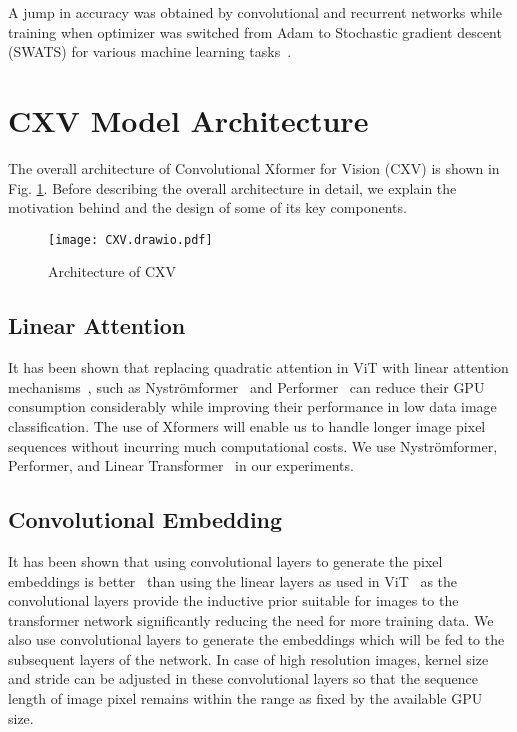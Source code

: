 \documentclass{article}
\begin{document}
A jump in accuracy was obtained by convolutional and recurrent networks while training when optimizer was switched from Adam to Stochastic gradient descent (SWATS) for various machine learning tasks~\cite{keskar2017improving}. 


\section{CXV Model Architecture}

The overall architecture of Convolutional Xformer for Vision (CXV) is shown in Fig. \ref{fig:CXV}. Before describing the overall architecture in detail, we explain the motivation behind and the design of some of its key components.
\begin{figure}[h]
\centering
\texttt{[image: CXV.drawio.pdf]}
\caption{Architecture of CXV}
\label{fig:CXV}
\end{figure}






\subsection{Linear Attention}

It has been shown that replacing quadratic attention in ViT with linear attention mechanisms~\cite{jeevan2021vision}, such as Nyströmformer~\cite{xiong2021nystromformer} and Performer~\cite{choromanski2021rethinking} can reduce their GPU consumption considerably while improving their performance in low data image classification. The use of Xformers will enable us to handle longer image pixel sequences without incurring much computational costs. We use Nyströmformer, Performer, and Linear Transformer~\cite{katharopoulos2020transformers} in our experiments.

\subsection{Convolutional Embedding}
It has been shown that using convolutional layers to generate the pixel embeddings is better~\cite{jeevan2021vision,graham2021levit} than using the linear layers as used in ViT~\cite{dosovitskiy2021image} as the convolutional layers provide the inductive prior suitable for images to the transformer network significantly reducing the need for more training data. We also use convolutional layers to generate the embeddings which will be fed to the subsequent layers of the network. In case of high resolution images, kernel size and stride can be adjusted in these convolutional layers so that the sequence length of image pixel remains within the range as fixed by the available GPU size. 
\end{document}
